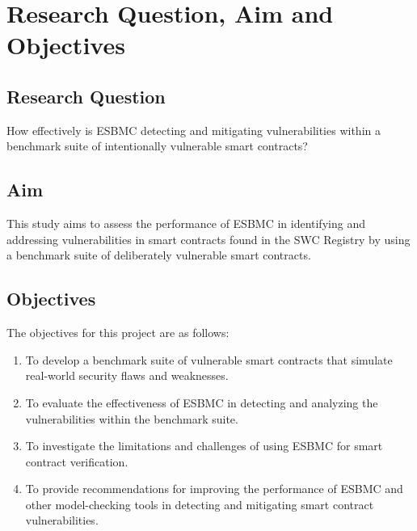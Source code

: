 \section{Research Question, Aim and Objectives}
\subsection{Research Question}
How effectively is ESBMC detecting and mitigating vulnerabilities within a benchmark suite of intentionally vulnerable smart contracts?

\subsection{Aim}
This study aims to assess the performance of ESBMC in identifying and addressing vulnerabilities in smart contracts found in the SWC Registry \cite{swc} by using a benchmark suite of deliberately vulnerable smart contracts. 

\subsection{Objectives}
The objectives for this project are as follows: 
\begin{enumerate}
    \item To develop a benchmark suite of vulnerable smart contracts that simulate real-world security flaws and weaknesses.
    \item To evaluate the effectiveness of ESBMC in detecting and analyzing the vulnerabilities within the benchmark suite.
    \item To investigate the limitations and challenges of using ESBMC for smart contract verification.
    \item To provide recommendations for improving the performance of ESBMC and other model-checking tools in detecting and mitigating smart contract vulnerabilities.
\end{enumerate}
